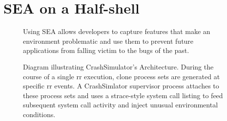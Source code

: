 \section{SEA on a Half-shell}
\label{SEC:approach}

\begin{figure}[t]
  \center{}
  \caption{Using SEA allows developers to capture features that make an
    environment problematic and use them to prevent future applications
    from falling victim to the bugs of the past.}
  \label{figure:approach}
\end{figure}

\begin{figure}[t]
  \center{}
  \caption{Diagram illustrating CrashSimulator's Architecture.  During the
    course of a single rr execution, clone process sets are generated at
    specific rr events.  A CrashSimlator supervisor process attaches to
    these process sets and uses a strace-style system call listing to feed
    subsequent system call activity and inject unusual environmental
    conditions.}
  \label{figure:architecture}
\end{figure}

